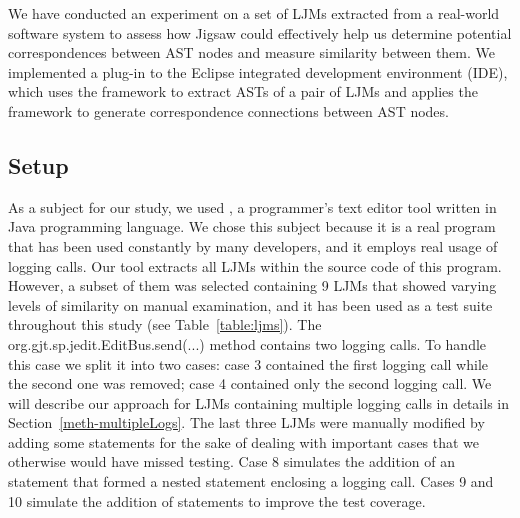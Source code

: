 We have conducted an experiment on a set of LJMs extracted from a real-world software system to assess how Jigsaw could effectively help us determine potential correspondences between AST nodes and measure similarity between them.
We implemented a plug-in to the Eclipse integrated development environment (IDE), which uses the  framework to extract ASTs of a pair of LJMs and applies the  framework to generate correspondence connections between AST nodes.

\subsection{Setup}  \label{study1_setup}

As a subject for our study, we used , a programmer’s text editor tool written in Java programming language. We chose this subject because it is a real program that has been used constantly by many developers, and it employs real usage of logging calls. Our tool extracts all LJMs within the source code of this program. However, a subset of them was selected containing 9 LJMs that showed varying levels of similarity on manual examination, and it has been used as a test suite throughout this study (see Table~\ref{table:ljms}). The org.gjt.sp.jedit.EditBus.send(...) method contains two logging calls. To handle this case we split it into two cases: case 3 contained the first logging call while the second one was removed; case 4 contained only the second logging call. We will describe our approach for LJMs containing multiple logging calls in details in Section~\ref{meth-multipleLogs}. The last three LJMs were manually modified by adding some statements for the sake of dealing with important cases that we otherwise would have missed testing. Case 8 simulates the addition of an statement that formed a nested statement enclosing a logging call. Cases 9 and 10 simulate the addition of statements to improve the test coverage.


